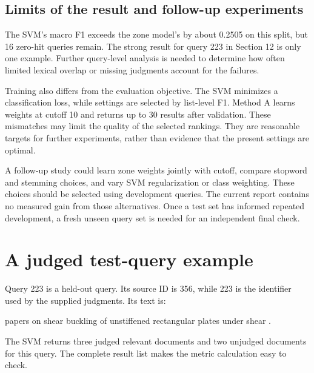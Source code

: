\documentclass[12pt,a4paper]{article}
\begin{document}
\subsection{Limits of the result and follow-up experiments}
The SVM's macro F1 exceeds the zone model's by about 0.2505 on this split, but 16 zero-hit queries remain. The strong result for query 223 in Section 12 is only one example. Further query-level analysis is needed to determine how often limited lexical overlap or missing judgments account for the failures.

Training also differs from the evaluation objective. The SVM minimizes a classification loss, while settings are selected by list-level F1. Method A learns weights at cutoff 10 and returns up to 30 results after validation. These mismatches may limit the quality of the selected rankings. They are reasonable targets for further experiments, rather than evidence that the present settings are optimal.

A follow-up study could learn zone weights jointly with cutoff, compare stopword and stemming choices, and vary SVM regularization or class weighting. These choices should be selected using development queries. The current report contains no measured gain from those alternatives. Once a test set has informed repeated development, a fresh unseen query set is needed for an independent final check.

\section{A judged test-query example}
Query 223 is a held-out query. Its source ID is 356, while 223 is the identifier used by the supplied judgments. Its text is:

papers on shear buckling of unstiffened rectangular plates under shear .

The SVM returns three judged relevant documents and two unjudged documents for this query. The complete result list makes the metric calculation easy to check.
\end{document}
